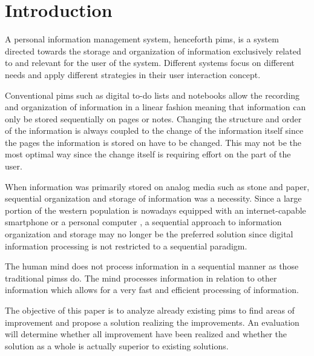 \section{Introduction}

A personal information management system, henceforth \gls{pims}, is a system
directed towards the storage and organization of information exclusively
related to and relevant for the user of the system. Different systems focus
on different needs and apply different strategies in their user interaction
concept.

Conventional \gls{pims} such as digital to-do lists and notebooks allow the
recording and organization of information in a linear fashion meaning that
information can only be stored sequentially on pages or notes. Changing the
structure and order of the information is always coupled to the change of the
information itself since the pages the information is stored on have to be
changed. This may not be the most optimal way since the change itself is
requiring effort on the part of the user.

When information was primarily stored on analog media such as stone and paper,
sequential organization and storage of information was a necessity. Since a
large portion of the western population is nowadays equipped with an
internet-capable smartphone or a personal computer \cite{rainie2010internet}, a
sequential approach to information organization and storage may no longer be
the preferred solution since digital information processing is not restricted
to a sequential paradigm.

The human mind does not process information in a sequential manner as those
traditional \glspl{pims} do. \cite{Sowa:1984:CSI:4569} The mind
processes information in relation to other information which allows for a very
fast and efficient processing of information.

The objective of this paper is to analyze already existing \gls{pims} to find
areas of improvement and propose a solution realizing the improvements. An
evaluation will determine whether all improvement have been realized and whether
the solution as a whole is actually superior to existing solutions.
